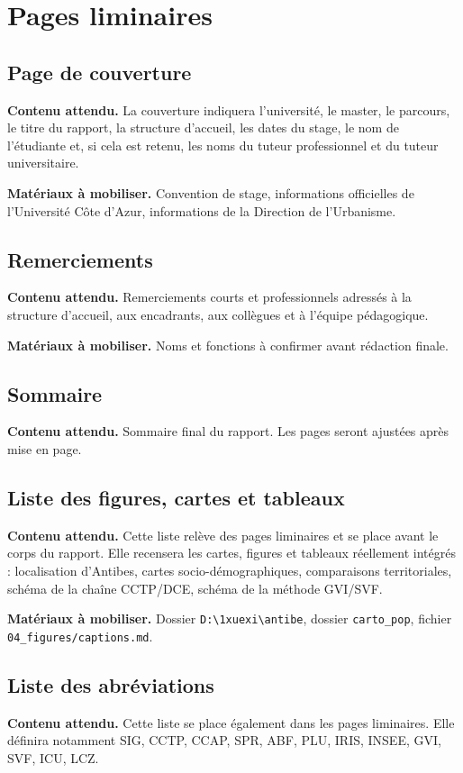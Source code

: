\documentclass[11pt,a4paper]{article}
\begin{document}
\section{Pages liminaires}

\subsection{Page de couverture}
\textbf{Contenu attendu.} La couverture indiquera l'université, le master, le parcours, le titre du rapport, la structure d'accueil, les dates du stage, le nom de l'étudiante et, si cela est retenu, les noms du tuteur professionnel et du tuteur universitaire.

\textbf{Matériaux à mobiliser.} Convention de stage, informations officielles de l'Université Côte d'Azur, informations de la Direction de l'Urbanisme.

\subsection{Remerciements}
\textbf{Contenu attendu.} Remerciements courts et professionnels adressés à la structure d'accueil, aux encadrants, aux collègues et à l'équipe pédagogique.

\textbf{Matériaux à mobiliser.} Noms et fonctions à confirmer avant rédaction finale.

\subsection{Sommaire}
\textbf{Contenu attendu.} Sommaire final du rapport. Les pages seront ajustées après mise en page.

\subsection{Liste des figures, cartes et tableaux}
\textbf{Contenu attendu.} Cette liste relève des pages liminaires et se place avant le corps du rapport. Elle recensera les cartes, figures et tableaux réellement intégrés : localisation d'Antibes, cartes socio-démographiques, comparaisons territoriales, schéma de la chaîne CCTP/DCE, schéma de la méthode GVI/SVF.

\textbf{Matériaux à mobiliser.} Dossier \texttt{D:\textbackslash 1xuexi\textbackslash antibe}, dossier \texttt{carto\_pop}, fichier \texttt{04\_figures/captions.md}.

\subsection{Liste des abréviations}
\textbf{Contenu attendu.} Cette liste se place également dans les pages liminaires. Elle définira notamment SIG, CCTP, CCAP, SPR, ABF, PLU, IRIS, INSEE, GVI, SVF, ICU, LCZ.
\end{document}
